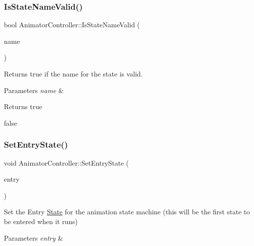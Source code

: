 \subsubsection{\texorpdfstring{Is\+State\+Name\+Valid()}{IsStateNameValid()}}
{\footnotesize\ttfamily bool Animator\+Controller\+::\+Is\+State\+Name\+Valid (\begin{DoxyParamCaption}\item[{std\+::string const \&}]{name }\end{DoxyParamCaption})}



Returns true if the name for the state is valid. 


\begin{DoxyParams}{Parameters}
{\em name} & \\
\hline
\end{DoxyParams}
\begin{DoxyReturn}{Returns}
true 

false 
\end{DoxyReturn}
\mbox{\label{classAnimatorController_adec385ab87a34b0919a040b1540f8b86}} 
\subsubsection{\texorpdfstring{Set\+Entry\+State()}{SetEntryState()}}
{\footnotesize\ttfamily void Animator\+Controller\+::\+Set\+Entry\+State (\begin{DoxyParamCaption}\item[{\hyperlink{structAnimState}{Anim\+State} $\ast$}]{entry }\end{DoxyParamCaption})}



Set the Entry \hyperlink{classState}{State} for the animation state machine (this will be the first state to be entered when it runs) 


\begin{DoxyParams}{Parameters}
{\em entry} & \\
\hline
\end{DoxyParams}
\mbox{\label{classAnimatorController_ac98dc31939a3e9b4377f01a0461b158d}} 
